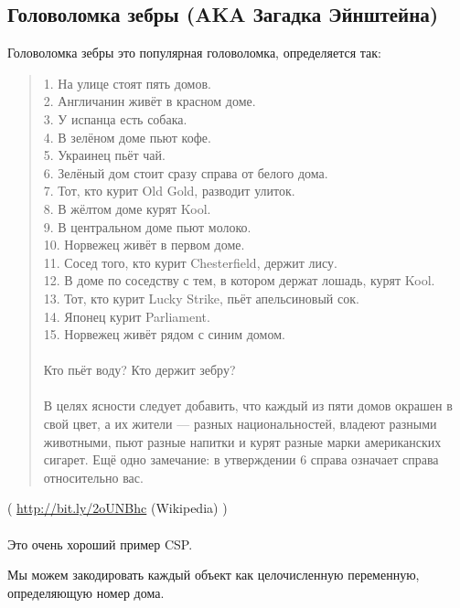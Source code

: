 \subsection{Головоломка зебры (\ac{AKA} Загадка Эйнштейна)}
\label{zebra_SMT}

Головоломка зебры это популярная головоломка, определяется так:

\begin{framed}
\begin{quotation}
1. На улице стоят пять домов.\\
2. Англичанин живёт в красном доме.\\
3. У испанца есть собака.\\
4. В зелёном доме пьют кофе.\\
5. Украинец пьёт чай.\\
6. Зелёный дом стоит сразу справа от белого дома.\\
7. Тот, кто курит Old Gold, разводит улиток.\\
8. В жёлтом доме курят Kool.\\
9. В центральном доме пьют молоко.\\
10. Норвежец живёт в первом доме.\\
11. Сосед того, кто курит Chesterfield, держит лису.\\
12. В доме по соседству с тем, в котором держат лошадь, курят Kool.\\
13. Тот, кто курит Lucky Strike, пьёт апельсиновый сок.\\
14. Японец курит Parliament.\\
15. Норвежец живёт рядом с синим домом.\\
\\
Кто пьёт воду? Кто держит зебру?\\
\\
В целях ясности следует добавить, что каждый из пяти домов окрашен в свой цвет, а их жители — разных национальностей, владеют разными животными, пьют разные напитки и курят разные марки американских сигарет. Ещё одно замечание: в утверждении 6 справа означает справа относительно вас.
\end{quotation}
\end{framed}
( \url{http://bit.ly/2oUNBhc} (Wikipedia) ) \\
\\
Это очень хороший пример \ac{CSP}.

Мы можем закодировать каждый объект как целочисленную переменную, определяющую номер дома.

